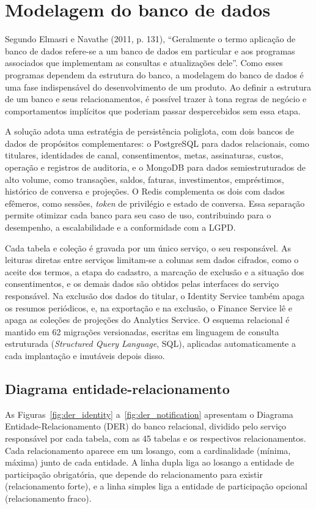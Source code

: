 \chapter{Modelagem do banco de dados}
\label{chap:banco}

Segundo Elmasri e Navathe (2011, p. 131), ``Geralmente o termo aplicação de banco de dados refere-se a um banco de dados em particular e aos programas associados que implementam as consultas e atualizações dele''. Como esses programas dependem da estrutura do banco, a modelagem do banco de dados é uma fase indispensável do desenvolvimento de um produto. Ao definir a estrutura de um banco e seus relacionamentos, é possível trazer à tona regras de negócio e comportamentos implícitos que poderiam passar despercebidos sem essa etapa.

A solução adota uma estratégia de persistência poliglota, com dois bancos de dados de propósitos complementares: o PostgreSQL para dados relacionais, como titulares, identidades de canal, consentimentos, metas, assinaturas, custos, operação e registros de auditoria, e o MongoDB para dados semiestruturados de alto volume, como transações, saldos, faturas, investimentos, empréstimos, histórico de conversa e projeções. O Redis complementa os dois com dados efêmeros, como sessões, \textit{token} de privilégio e estado de conversa. Essa separação permite otimizar cada banco para seu caso de uso, contribuindo para o desempenho, a escalabilidade e a conformidade com a LGPD.

Cada tabela e coleção é gravada por um único serviço, o seu responsável. As leituras diretas entre serviços limitam-se a colunas sem dados cifrados, como o aceite dos termos, a etapa do cadastro, a marcação de exclusão e a situação dos consentimentos, e os demais dados são obtidos pelas interfaces do serviço responsável. Na exclusão dos dados do titular, o Identity Service também apaga os resumos periódicos, e, na exportação e na exclusão, o Finance Service lê e apaga as coleções de projeções do Analytics Service. O esquema relacional é mantido em 62 migrações versionadas, escritas em linguagem de consulta estruturada (\textit{Structured Query Language}, SQL), aplicadas automaticamente a cada implantação e imutáveis depois disso.

\section{Diagrama entidade-relacionamento}

As Figuras~\ref{fig:der_identity} a~\ref{fig:der_notification} apresentam o Diagrama Entidade-Relacionamento (DER) do banco relacional, dividido pelo serviço responsável por cada tabela, com as 45 tabelas e os respectivos relacionamentos. Cada relacionamento aparece em um losango, com a cardinalidade (mínima, máxima) junto de cada entidade. A linha dupla liga ao losango a entidade de participação obrigatória, que depende do relacionamento para existir (relacionamento forte), e a linha simples liga a entidade de participação opcional (relacionamento fraco).

